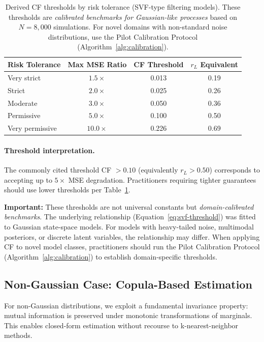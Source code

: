 \documentclass[10pt]{article} %
\theoremstyle{plain}
\theoremstyle{definition}
\begin{document}
\begin{table}[!htbp]
\centering
\caption{Derived CF thresholds by risk tolerance (SVF-type filtering models). These thresholds are \emph{calibrated benchmarks for Gaussian-like processes} based on $N = 8{,}000$ simulations. For novel domains with non-standard noise distributions, use the Pilot Calibration Protocol (Algorithm~\ref{alg:calibration}).}
\label{tab:svf-thresholds}
\begin{tabular}{lccc}
\toprule
Risk Tolerance & Max MSE Ratio & CF Threshold & $r_L$ Equivalent \\
\midrule
Very strict & $1.5\times$ & 0.013 & 0.19 \\
Strict & $2.0\times$ & 0.025 & 0.26 \\
Moderate & $3.0\times$ & 0.050 & 0.36 \\
Permissive & $5.0\times$ & 0.100 & 0.50 \\
Very permissive & $10.0\times$ & 0.226 & 0.69 \\
\bottomrule
\end{tabular}
\end{table}

\paragraph{Threshold interpretation.} The commonly cited threshold CF $> 0.10$ (equivalently $r_L > 0.50$) corresponds to accepting up to $5\times$ MSE degradation. Practitioners requiring tighter guarantees should use lower thresholds per Table~\ref{tab:svf-thresholds}. 

\textbf{Important:} These thresholds are not universal constants but \emph{domain-calibrated benchmarks}. The underlying relationship (Equation~\ref{eq:svf-threshold}) was fitted to Gaussian state-space models. For models with heavy-tailed noise, multimodal posteriors, or discrete latent variables, the relationship may differ. When applying CF to novel model classes, practitioners should run the Pilot Calibration Protocol (Algorithm~\ref{alg:calibration}) to establish domain-specific thresholds.

\subsection{Non-Gaussian Case: Copula-Based Estimation}
\label{sec:copula}

For non-Gaussian distributions, we exploit a fundamental invariance property: mutual information is preserved under monotonic transformations of marginals. This enables closed-form estimation without recourse to k-nearest-neighbor methods.
\end{document}
